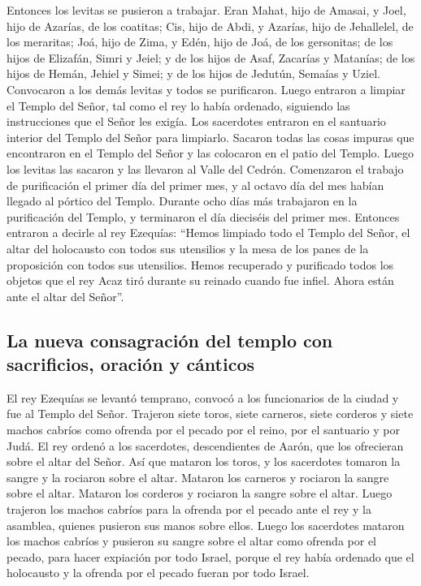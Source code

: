  Entonces los levitas se pusieron a trabajar. Eran Mahat,
hijo de Amasai, y Joel, hijo de Azarías, de los coatitas; Cis, hijo de
Abdi, y Azarías, hijo de Jehallelel, de los meraritas; Joá, hijo de
Zima, y Edén, hijo de Joá, de los gersonitas;  de los
hijos de Elizafán, Simri y Jeiel; y de los hijos de Asaf, Zacarías y
Matanías;  de los hijos de Hemán, Jehiel y Simei; y de
los hijos de Jedutún, Semaías y Uziel.  Convocaron a los
demás levitas y todos se purificaron. Luego entraron a limpiar el Templo
del Señor, tal como el rey lo había ordenado, siguiendo las
instrucciones que el Señor les exigía.  Los sacerdotes
entraron en el santuario interior del Templo del Señor para limpiarlo.
Sacaron todas las cosas impuras que encontraron en el Templo del Señor y
las colocaron en el patio del Templo. Luego los levitas las sacaron y
las llevaron al Valle del Cedrón.  Comenzaron el trabajo
de purificación el primer día del primer mes, y al octavo día del mes
habían llegado al pórtico del Templo. Durante ocho días más trabajaron
en la purificación del Templo, y terminaron el día dieciséis del primer
mes.  Entonces entraron a decirle al rey Ezequías:
``Hemos limpiado todo el Templo del Señor, el altar del holocausto con
todos sus utensilios y la mesa de los panes de la proposición con todos
sus utensilios.  Hemos recuperado y purificado todos los
objetos que el rey Acaz tiró durante su reinado cuando fue infiel. Ahora
están ante el altar del Señor''.

\hypertarget{la-nueva-consagraciuxf3n-del-templo-con-sacrificios-oraciuxf3n-y-cuxe1nticos}{%
\subsection{La nueva consagración del templo con sacrificios, oración y
cánticos}\label{la-nueva-consagraciuxf3n-del-templo-con-sacrificios-oraciuxf3n-y-cuxe1nticos}}

 El rey Ezequías se levantó temprano, convocó a los
funcionarios de la ciudad y fue al Templo del Señor. 
Trajeron siete toros, siete carneros, siete corderos y siete machos
cabríos como ofrenda por el pecado por el reino, por el santuario y por
Judá. El rey ordenó a los sacerdotes, descendientes de Aarón, que los
ofrecieran sobre el altar del Señor.  Así que mataron los
toros, y los sacerdotes tomaron la sangre y la rociaron sobre el altar.
Mataron los carneros y rociaron la sangre sobre el altar. Mataron los
corderos y rociaron la sangre sobre el altar.  Luego
trajeron los machos cabríos para la ofrenda por el pecado ante el rey y
la asamblea, quienes pusieron sus manos sobre ellos. 
Luego los sacerdotes mataron los machos cabríos y pusieron su sangre
sobre el altar como ofrenda por el pecado, para hacer expiación por todo
Israel, porque el rey había ordenado que el holocausto y la ofrenda por
el pecado fueran por todo Israel.

